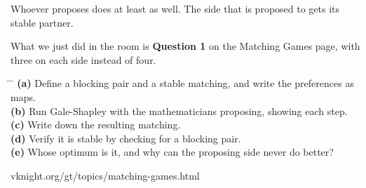 \vspace{0.35cm}

{\large Whoever proposes does at least as well. The side that is proposed to
gets its  stable partner.}

\vspace{0.35cm}

\begin{center}
\end{center}

\newpage
{}

\vspace{0.5cm}

{\large What we just did in the room is \textbf{Question 1} on the Matching
Games page, with three on each side instead of four.}

\vspace{0.9cm}

\hspace{0.6cm}
\begin{minipage}{0.92\linewidth}
{\large
\begin{tabbing}
\hspace{1.2cm} \= \hspace{17cm} \= \kill
\textbf{(a)} \> Define a blocking pair and a stable matching, and write the
  preferences as maps. \> [5]\\[0.55em]
\textbf{(b)} \> Run Gale-Shapley with the mathematicians proposing, showing
  each step. \> [7]\\[0.55em]
\textbf{(c)} \> Write down the resulting matching. \> [3]\\[0.55em]
\textbf{(d)} \> Verify it is stable by checking for a blocking pair. \> [4]\\[0.55em]
\textbf{(e)} \> Whose optimum is it, and why can the proposing side never do
  better? \> [6]
\end{tabbing}}
\end{minipage}

\vspace{1.2cm}

\begin{center}
{\large\color{inkgrey} vknight.org/gt/topics/matching-games.html}
\end{center}

